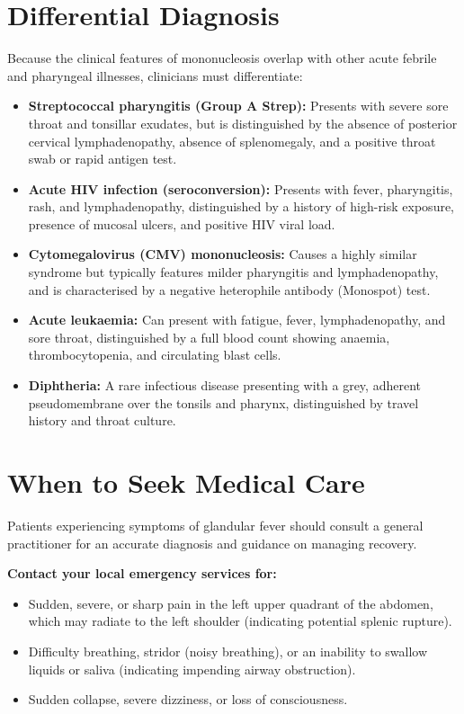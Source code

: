\section*{Differential Diagnosis}
Because the clinical features of mononucleosis overlap with other acute febrile and pharyngeal illnesses, clinicians must differentiate:
\begin{itemize}
    \item \textbf{Streptococcal pharyngitis (Group A Strep):} Presents with severe sore throat and tonsillar exudates, but is distinguished by the absence of posterior cervical lymphadenopathy, absence of splenomegaly, and a positive throat swab or rapid antigen test.
    \item \textbf{Acute HIV infection (seroconversion):} Presents with fever, pharyngitis, rash, and lymphadenopathy, distinguished by a history of high-risk exposure, presence of mucosal ulcers, and positive HIV viral load.
    \item \textbf{Cytomegalovirus (CMV) mononucleosis:} Causes a highly similar syndrome but typically features milder pharyngitis and lymphadenopathy, and is characterised by a negative heterophile antibody (Monospot) test.
    \item \textbf{Acute leukaemia:} Can present with fatigue, fever, lymphadenopathy, and sore throat, distinguished by a full blood count showing anaemia, thrombocytopenia, and circulating blast cells.
    \item \textbf{Diphtheria:} A rare infectious disease presenting with a grey, adherent pseudomembrane over the tonsils and pharynx, distinguished by travel history and throat culture.
\end{itemize}

\section*{When to Seek Medical Care}
Patients experiencing symptoms of glandular fever should consult a general practitioner for an accurate diagnosis and guidance on managing recovery.

\textbf{Contact your local emergency services for:}
\begin{itemize}
    \item Sudden, severe, or sharp pain in the left upper quadrant of the abdomen, which may radiate to the left shoulder (indicating potential splenic rupture).
    \item Difficulty breathing, stridor (noisy breathing), or an inability to swallow liquids or saliva (indicating impending airway obstruction).
    \item Sudden collapse, severe dizziness, or loss of consciousness.
\end{itemize}

